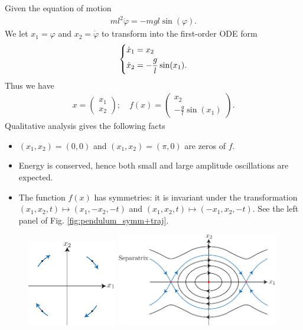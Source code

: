 \begin{ex}[Pendulum]
Given the equation of motion
\begin{align}
	ml^2 \ddot{\varphi} = -mgl \sin(\varphi).
\end{align}
We let $ x_1 = \varphi$ and $ {x}_2 =\dot{\varphi}$ to transform into the first-order ODE form
\begin{align}
	\begin{dcases}
	\dot{x}_1 = x_2 \\
\dot{x}_2 = - \frac{g}{l} \sin (x_1).
	\end{dcases}
\end{align}
Thus we have 
\begin{align}
 {x} = 
\begin{pmatrix}
	x_1 \\ x_2
\end{pmatrix}; \quad
f( {x}) = 
\begin{pmatrix}
	x_2 \\ - \frac{g}{l}\sin(x_1)	
\end{pmatrix}.
\end{align}
Qualitative analysis gives the following facts
\begin{itemize}
	\item $(x_1, x_2) = (0,0)$ and $(x_1, x_2) = (\pi , 0)$ are zeros of $f$.
	\item Energy is conserved, hence both small and large amplitude oscillations are expected.
	\item The function $f(x)$ has symmetries: it is invariant under the transformation $(x_1, x_2, t) \mapsto (x_1, -x_2, -t)$ and $(x_1, x_2, t) \mapsto (-x_1, x_2, -t)$. See the left panel of Fig. \ref{fig:pendulum_symm+traj}.
\end{itemize}
\begin{figure}[h!]
	\centering
	\includegraphics[width=0.35\textwidth]{figures/intro/6pendulum_symmetries.pdf}
	\includegraphics[width=0.63\textwidth]{figures/intro/5pendulum.pdf}

\end{figure}
\end{ex}
